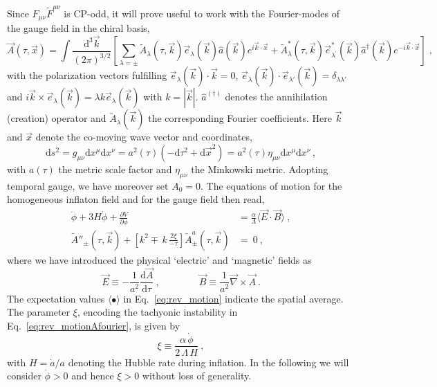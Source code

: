 Since $F_{\mu \nu} \tilde{F}^{\mu \nu}$ is CP-odd, it will prove useful to work with the Fourier-modes of the gauge field in the chiral basis, 
\begin{equation}
	\label{eq:Fourier_A}
	 \vec{A}(\tau, \vec{x}) = \int \frac{\textrm{d}^3 \vec{k}}{(2\pi)^{3/2}} \left[ \sum_{\lambda = \pm} \tilde{A}_{\lambda}(\tau, \vec{k}) \vec{e}_\lambda (\vec{k}) \hat{a}(\vec{k}) e^{i\vec{k}\cdot\vec{x}} + \tilde{A}_{\lambda}^*(\tau, \vec{k}) \vec{e}^*_{\lambda^\prime} (\vec{k}) \hat{a}^\dagger (\vec{k}) e^{-i\vec{k}\cdot\vec{x}} \right] \; ,
\end{equation}
with the polarization vectors fulfilling $\vec e_\lambda(\vec k) \cdot \vec k = 0$, $\vec e_\lambda(\vec k) \cdot \vec e_{\lambda'}(\vec k) = \delta_{\lambda \lambda'}$ and  $i \vec k \times \vec e_\lambda(\vec k) = \lambda  k\vec e_{\lambda}(\vec k)$ with $k = |\vec k|$. $\hat a^{(\dagger)}$ denotes the annihilation (creation) operator and $\tilde{A}_\lambda(\vec k)$ the corresponding Fourier coefficients. Here $\vec k$ and $\vec x$ denote the co-moving wave vector and coordinates,
\begin{equation}
 \textrm{d} s^2 = g_{\mu \nu }\textrm{d}x^\mu \textrm{d}x^\nu = a^2 (\tau) (-\textrm{d} \tau^2 + \textrm{d} \vec{x}^2 ) = a^2 (\tau) \eta_{\mu \nu }\textrm{d}x^\mu \textrm{d}x^\nu \,,
\end{equation}
with $a(\tau)$ the metric scale factor and $\eta_{\mu \nu}$ the Minkowski metric. Adopting temporal gauge, we have moreover set $A_0 = 0$. The equations of motion for the homogeneous inflaton field and for the gauge field then read,
\begin{align}
\label{eq:rev_motion}
\ddot \phi + 3 H \dot{\phi} + \frac{\partial V}{\partial \phi} & = \frac{\alpha}{\Lambda} \langle \vec{E} \cdot \vec{B} \rangle \ ,\\
\label{eq:rev_motionAfourier}
 \tilde{A}''_{\pm}(\tau,\vec{k})  + \left[ k^2 \mp \, k  \, \frac{2\xi}{-\tau} \right]\tilde{A}^{a}_{\pm}(\tau,\vec{k}) & =  \ 0 \ , 
\end{align}
where we have introduced the physical `electric' and `magnetic' fields as
\begin{equation}
	\label{eq:rev_electric_magnetic}
	\vec{E} \equiv -\frac{1 }{a^2} \frac{\textrm{d} \vec{A}}{\textrm{d} \tau}  \ , \qquad \qquad  \vec{B} \equiv \frac{1}{a^2} \vec{\nabla} \times \vec{A}  \ .
\end{equation}
The expectation values $\langle \bullet \rangle$ in Eq.~\eqref{eq:rev_motion} indicate the spatial average.
The parameter $\xi$, encoding the tachyonic instability in Eq.~\eqref{eq:rev_motionAfourier}, is given by
\begin{equation}
\xi \equiv \frac{\alpha \, \dot{\phi}}{2 \, \Lambda \, H} \ ,
\label{eq:rev_xi}
\end{equation}
with $H = \dot a/a$ denoting the Hubble rate during inflation. In the following we will consider $\dot \phi > 0$ and hence $\xi > 0$ without loss of generality.


